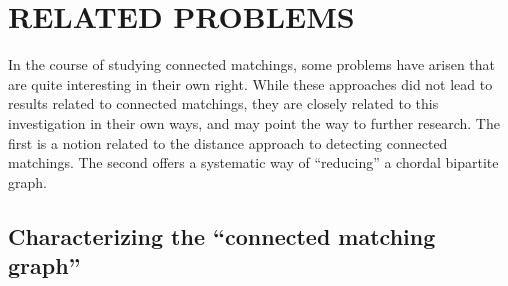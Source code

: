 \chapter{RELATED PROBLEMS}

In the course of studying connected matchings, some problems have arisen that are quite interesting in their own right.  While these approaches did not lead to results related to connected matchings, they are closely related to this investigation in their own ways, and may point the way to further research.  The first is a notion related to the distance approach to detecting connected matchings.  The second offers a systematic way of ``reducing'' a chordal bipartite graph.  
	
	\section{Characterizing the ``connected matching graph''}

